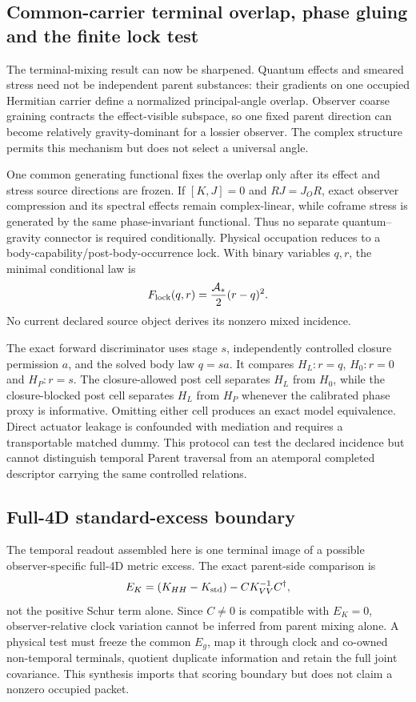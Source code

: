 \documentclass[11pt]{article}
\begin{document}
\subsection{Common-carrier terminal overlap, phase gluing and the finite lock test}

The terminal-mixing result can now be sharpened.  Quantum effects and smeared
stress need not be independent parent substances: their gradients on one
occupied Hermitian carrier define a normalized principal-angle overlap.
Observer coarse graining contracts the effect-visible subspace, so one fixed
parent direction can become relatively gravity-dominant for a lossier
observer.  The complex structure permits this mechanism but does not select a
universal angle.

One common generating functional fixes the overlap only after its effect and
stress source directions are frozen.  If $[K,J]=0$ and $RJ=J_OR$, exact
observer compression and its spectral effects remain complex-linear, while
coframe stress is generated by the same phase-invariant functional.  Thus no
separate quantum--gravity connector is required conditionally.  Physical
occupation reduces to a body-capability/post-body-occurrence lock.  With
binary variables $q,r$, the minimal conditional law is
\[
 F_{\rm lock}(q,r)=\frac{\mathcal A_*}{2}(r-q)^2.
\]
No current declared source object derives its nonzero mixed incidence.

The exact forward discriminator uses stage $s$, independently controlled
closure permission $a$, and the solved body law $q=sa$.  It compares
$H_L:r=q$, $H_0:r=0$ and $H_P:r=s$.  The closure-allowed post cell separates
$H_L$ from $H_0$, while the closure-blocked post cell separates $H_L$ from
$H_P$ whenever the calibrated phase proxy is informative.  Omitting either
cell produces an exact model equivalence.  Direct actuator leakage is
confounded with mediation and requires a transportable matched dummy.  This
protocol can test the declared incidence but cannot distinguish temporal
Parent traversal from an atemporal completed descriptor carrying the same
controlled relations.

\subsection{Full-4D standard-excess boundary}

The temporal readout assembled here is one terminal image of a possible
observer-specific full-4D metric excess.  The exact parent-side comparison is
\[
 E_K=(K_{HH}-K_{\rm std})-CK_{VV}^{-1}C^\dagger,
\]
not the positive Schur term alone.  Since \(C\neq0\) is compatible with
\(E_K=0\), observer-relative clock variation cannot be inferred from parent
mixing alone.  A physical test must freeze the common \(E_g\), map it through
clock and co-owned non-temporal terminals, quotient duplicate information and
retain the full joint covariance.  This synthesis imports that scoring
boundary but does not claim a nonzero occupied packet.
\end{document}
